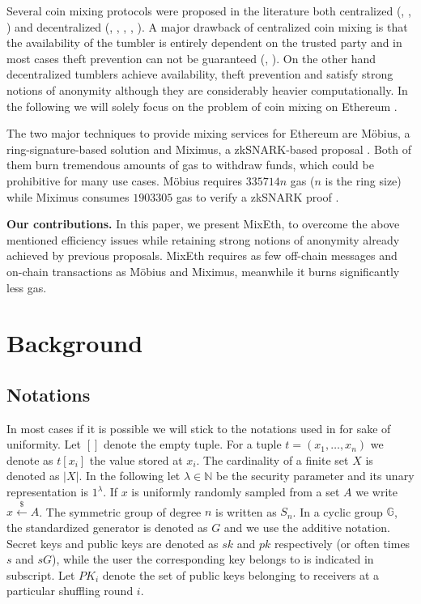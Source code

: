 \documentclass[a4paper]{article}
\theoremstyle{definition}
\begin{document}
Several coin mixing protocols were proposed in the literature both centralized (\cite{bonneau2014mixcoin}, \cite{valenta2015blindcoin}, \cite{heilman2017tumblebit}) and decentralized (\cite{maxwell2013coinjoin}, \cite{ruffing2014coinshuffle}, \cite{miximus2018}, \cite{meiklejohn2018mobius}, \cite{bissias2014sybil}). A major drawback of centralized coin mixing is that the availability of the tumbler is entirely dependent on the trusted party and in most cases theft prevention can not be guaranteed (\cite{bonneau2014mixcoin}, \cite{valenta2015blindcoin}). On the other hand decentralized tumblers achieve availability, theft prevention and satisfy strong notions of anonymity although they are considerably heavier computationally. In the following we will solely focus on the problem of coin mixing on Ethereum \cite{wood2014ethereum}. 

The two major techniques to provide mixing services for Ethereum are Möbius, a ring-signature-based solution \cite{meiklejohn2018mobius} and Miximus, a zkSNARK-based proposal \cite{miximus2018}. Both of them burn tremendous amounts of gas to withdraw funds, which could be prohibitive for many use cases. Möbius requires $\num[group-separator={,}]{335714}n$ gas ($n$ is the ring size) while Miximus consumes $\num[group-separator={,}]{1903305}$ gas to verify a zkSNARK proof \cite{miximus2018gascost}.   

\textbf{Our contributions.} In this paper, we present MixEth, to overcome the above mentioned efficiency issues while retaining strong notions of anonymity already achieved by previous proposals. MixEth requires as few off-chain messages and on-chain transactions as Möbius and Miximus, meanwhile it burns significantly less gas.


\section{Background}
\subsection{Notations}
In most cases if it is possible we will stick to the notations used in \cite{meiklejohn2018mobius} for sake of uniformity. 
Let $[]$ denote the empty tuple. For a tuple $t=(x_1,\dots,x_n)$ we denote as $t[x_i]$ the value stored at $x_{i}$. The cardinality of a finite set $X$ is denoted as $|X|$. In the following let $\lambda \in \mathbb{N}$ be the security parameter and its unary representation is $1^{\lambda}$. If $x$ is uniformly randomly sampled from a set $A$ we write $x\stackrel{\$}{\leftarrow}A$. The symmetric group of degree $n$ is written as ${S}_n$. In a cyclic group $\mathbb{G}$, the standardized generator is denoted as $G$ and we use the additive notation. Secret keys and public keys are denoted as $sk$ and $pk$ respectively (or often times $s$ and $sG$), while the user the corresponding key belongs to is indicated in subscript. Let $PK_{i}$ denote the set of public keys belonging to receivers at a particular shuffling round $i$.
\end{document}
